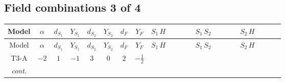 \documentclass[8pt]{article}
\begin{document}
\begin{landscape}
\subsection*{Field combinations 3 of 4}
\begin{longtable}{@{}cccccccc >{\raggedright\arraybackslash}p{0.21\linewidth} >{\raggedright\arraybackslash}p{0.21\linewidth} >{\raggedright\arraybackslash}p{0.21\linewidth}@{}}
\toprule
Model & $\alpha$ & $d_{S_1}$ & $Y_{S_1}$ & $d_{S_2}$ & $Y_{S_2}$ & $d_F$ & $Y_F$ & $S_1\,H$ & $S_1\,S_2$ & $S_2\,H$ \\
\midrule
\endfirsthead
\toprule
Model & $\alpha$ & $d_{S_1}$ & $Y_{S_1}$ & $d_{S_2}$ & $Y_{S_2}$ & $d_F$ & $Y_F$ & $S_1\,H$ & $S_1\,S_2$ & $S_2\,H$ \\
\midrule
\endhead
T3-A & $-2$ & $1$ & $-1$ & $3$ & $0$ & $2$ & $-\frac{1}{2}$ & \scriptsize\adjustbox{max width=\linewidth}{$\begin{gathered} +H_{a_2} S_1 H_{a_1}{}^{\dagger } S_1{}^{\dagger } \mathcal{I}_{H1,a_1,a_2}{}^1 \lambda_{HS_1}^{(1)}^{(1)}\end{gathered}$} & \scriptsize\adjustbox{max width=\linewidth}{$\begin{gathered} +S_1 S_{2,j_2} S_1{}^{\dagger } S_{2,j_1}{}^{\dagger } \mathcal{I}_{12,j_1,j_2}{}^1 \lambda_{12}^{(1)}^{(1)}\end{gathered}$} & \scriptsize\adjustbox{max width=\linewidth}{$\begin{gathered} +\frac{1}{2} H_{a_2} S_{2,j_2} H_{a_1}{}^{\dagger } S_{2,j_1}{}^{\dagger } \mathcal{I}_{H2,a_1,a_2,j_1,j_2}{}^1 \lambda_{HS_2}^{(1)}^{(1)} \\ +\frac{1}{2} H_{a_2} S_{2,j_2} H_{a_1}{}^{\dagger } S_{2,j_1}{}^{\dagger } \mathcal{I}_{H2,a_1,a_2,j_2,j_1}{}^1 \lambda_{HS_2}^{(1)}^{(1)} \\ +\frac{1}{2} H_{a_2} S_{2,j_2} H_{a_1}{}^{\dagger } S_{2,j_1}{}^{\dagger } \mathcal{I}_{H2,a_1,a_2,j_1,j_2}{}^2 \lambda_{HS_2}^{(1)}^{(2)}\end{gathered}$} \\
\textit{cont.} &  &  &  &  &  &  &  &  &  & \scriptsize\adjustbox{max width=\linewidth}{$\begin{gathered} +\frac{1}{2} H_{a_2} S_{2,j_2} H_{a_1}{}^{\dagger } S_{2,j_1}{}^{\dagger } \mathcal{I}_{H2,a_1,a_2,j_2,j_1}{}^2 \lambda_{HS_2}^{(1)}^{(2)}\end{gathered}$} \\
\midrule

\end{longtable}
\end{landscape}
\end{document}

